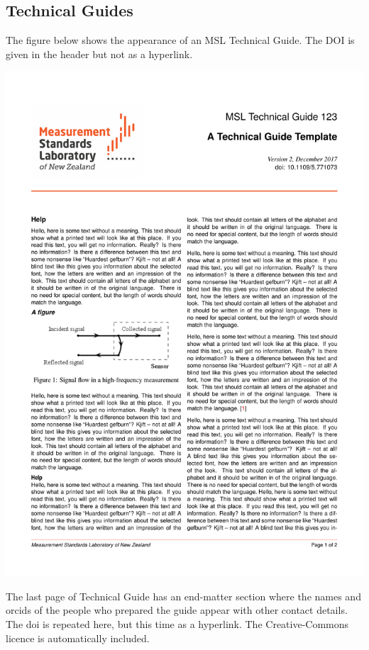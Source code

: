 {\subsection{Technical Guides}
The figure below shows the appearance of an MSL Technical Guide. The DOI is given in the header but not as a hyperlink.
\begin{center}
\includegraphics[scale=.5,page=1]{pictures/TG_Template}
\end{center}

\newpage
The last page of Technical Guide has an end-matter section where the names and orcids of the people who prepared the guide appear with other contact details. The doi is repeated here, but this time as a hyperlink. The Creative-Commons licence is automatically included.

}
